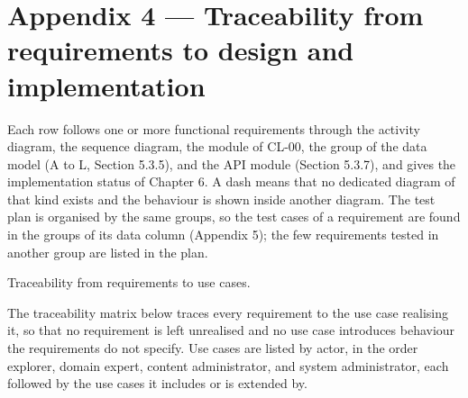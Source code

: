 \newpage
\section*{Appendix 4 --- Traceability from requirements to design and implementation}

Each row follows one or more functional requirements through the activity diagram, the sequence diagram, the module of CL-00, the group of the data model (A to L, Section 5.3.5), and the API module (Section 5.3.7), and gives the implementation status of Chapter 6. A dash means that no dedicated diagram of that kind exists and the behaviour is shown inside another diagram. The test plan is organised by the same groups, so the test cases of a requirement are found in the groups of its data column (Appendix 5); the few requirements tested in another group are listed in the plan.

Traceability from requirements to use cases.

The traceability matrix below traces every requirement to the use case realising it, so that no requirement is left unrealised and no use case introduces behaviour the requirements do not specify. Use cases are listed by actor, in the order explorer, domain expert, content administrator, and system administrator, each followed by the use cases it includes or is extended by.

